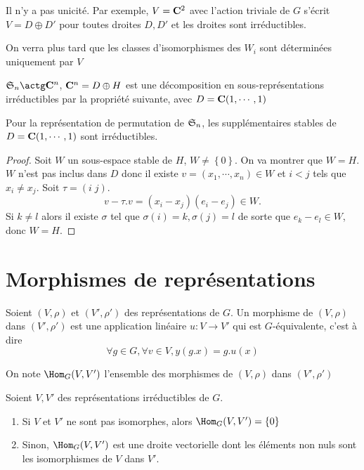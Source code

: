 \begin{rem}
Il n'y a pas unicité. Par exemple, $V=\mathbf C^2$ avec l'action triviale de $G$ s'écrit  $V=D\oplus D'$ pour toutes droites  $D,D'$ et les droites sont irréductibles. 

On verra plus tard que les classes d'isomorphismes des $W_i$ sont déterminées uniquement par  $V$
\end{rem}

\begin{ex}
    $\gS_n\actg \C^n$, $\mathbf C^n=D\oplus H$ est une décomposition en sous-représentations irréductibles par la propriété suivante, avec $D=\mathbf C (1,\cdots ,1)$
\end{ex}

\begin{prop}
    Pour la représentation de permutation de $\mathfrak S_n$, les supplémentaires stables de  $D=\mathbf C(1,\cdots ,1)$ sont irréductibles.
\end{prop}

\begin{proof}
    Soit $W$ un sous-espace stable de  $H$,  $W\neq \left\{ 0 \right\} $. On va montrer que $W =H$.  $W$ n'est pas inclus dans  $D$ donc il existe  $v=(x_1,\cdots ,x_n) \in  W$ et $i<j$ tels que  $x_i\neq x_j$. Soit $\tau = (i\;j)$. \[v-\tau.v=(x_i-x_j)(e_i-e_j) \in  W.\] Si $k\neq l$ alors il existe  $\sigma$ tel que  $\sigma(i)=k, \sigma(j)=l$ de sorte que  $e_k-e_l \in  W$, donc $W=H$.
\end{proof}

\section{Morphismes de représentations}

\begin{dfn}
    Soient $(V, \rho)$ et  $(V', \rho')$ des représentations de  $G$. Un morphisme de  $(V, \rho)$ dans  $(V', \rho')$ est une application linéaire  $u:V\longrightarrow V'$ qui est $G$-équivalente, c'est à dire  \[
        \forall  g \in  G, \forall  v \in  V, y(g.x)=g.u(x)
    \] 
\end{dfn}

\begin{rem}[Notation]
    On note $\Hom_G(V, V')$ l'ensemble des morphismes de $(V, \rho)$ dans $(V', \rho')$
\end{rem}

\begin{lmm}
Soient $V, V'$ des représentations irréductibles de  $G$.
 \begin{enumerate}
     \item Si $V$ et  $V'$ ne sont pas isomorphes, alors  $\Hom_G(V, V')= \left\{ 0 \right\} $ 
     \item Sinon, $\Hom_G(V, V')$ est une droite vectorielle dont les éléments non nuls sont les isomorphismes de  $V$ dans  $V'$.
\end{enumerate}
\end{lmm}

